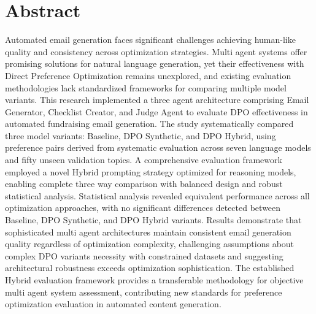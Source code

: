 \chapter*{\Large \center Abstract}


Automated email generation faces significant challenges achieving human-like quality and consistency across optimization strategies. Multi agent systems offer promising solutions for natural language generation, yet their effectiveness with Direct Preference Optimization remains unexplored, and existing evaluation methodologies lack standardized frameworks for comparing multiple model variants. This research implemented a three agent architecture comprising Email Generator, Checklist Creator, and Judge Agent to evaluate DPO effectiveness in automated fundraising email generation. The study systematically compared three model variants: Baseline, DPO Synthetic, and DPO Hybrid, using preference pairs derived from systematic evaluation across seven language models and fifty unseen validation topics. A comprehensive evaluation framework employed a novel Hybrid prompting strategy optimized for reasoning models, enabling complete three way comparison with balanced design and robust statistical analysis. Statistical analysis revealed equivalent performance across all optimization approaches, with no significant differences detected between Baseline, DPO Synthetic, and DPO Hybrid variants. Results demonstrate that sophisticated multi agent architectures maintain consistent email generation quality regardless of optimization complexity, challenging assumptions about complex DPO variants necessity with constrained datasets and suggesting architectural robustness exceeds optimization sophistication. The established Hybrid evaluation framework provides a transferable methodology for objective multi agent system assessment, contributing new standards for preference optimization evaluation in automated content generation.